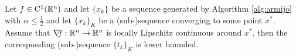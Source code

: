 \documentclass[10pt,a4paper]{article}
\begin{document}
\begin{proposition}
	Let $f\in \mathord{\mathrm{C^1}}(\mathbb{R}^n)$ and let $\{x_k\}$ be a sequence generated by Algorithm \ref{alg:armijo} with $\alpha\leq \frac{1}{2}$ and let $\{x_k\}_K$ be a (sub-)sequence converging to some point $x^*$. Assume that $\operatorname*{\mathit{\nabla \!f}}:\mathbb{R}^n\to\mathbb{R}^n$ is locally Lipschitz continuous around $x^*$, then the corresponding (sub-)sequence $\{t_k\}_K$ is lower bounded.
\end{proposition}
\end{document}
